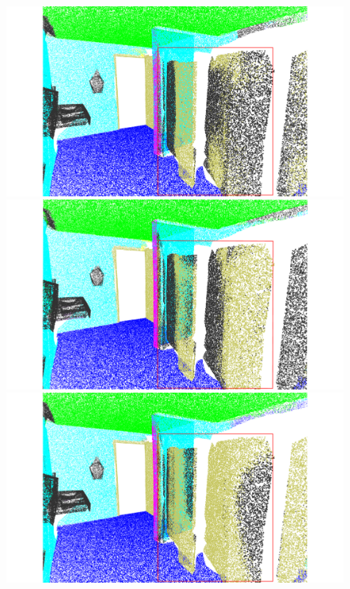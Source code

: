 \begin{figure}[htbp]
    \begin{minipage}{0.02\textwidth}
        \centering
    \end{minipage}
    \hfill
    \begin{minipage}{0.185\textwidth}
        \centering
        \includegraphics[width=\textwidth]{fig/supplement/semantic_segmentation/wc_2/DAPT_wc_2.pdf}
    \end{minipage}
    \hfill
    \begin{minipage}{0.185\textwidth}
        \centering
        \includegraphics[width=\textwidth]{fig/supplement/semantic_segmentation/wc_2/IDPT_wc_2.pdf} %
    \end{minipage}
    \hfill
    \begin{minipage}{0.185\textwidth}
        \centering
        \includegraphics[width=\textwidth]{fig/supplement/semantic_segmentation/wc_2/PointGST_wc_2.pdf}

\end{minipage}
\end{figure}
